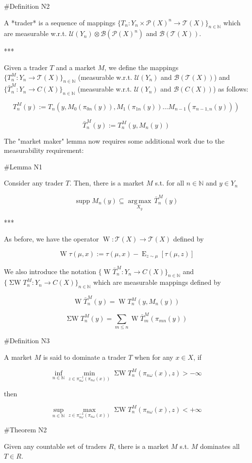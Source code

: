 \documentclass[a4paper]{article}
\DeclareMathOperator{\Supp}{supp}
\DeclareMathOperator{\E}{E}
\newcommand{\Argmax}[1]{\underset{#1}{\operatorname{arg\,max}}\,}
\newcommand{\Nats}{\mathbb{N}}
\newcommand{\Prob}{\mathcal{P}}
\newcommand{\T}{\mathcal{T}}
\newcommand{\B}{\mathcal{B}}
\newcommand{\UM}{\mathcal{U}}
\newcommand{\W}{\operatorname{W}}
\newcommand{\SW}{\operatorname{\Sigma W}}
\begin{document}
\#Definition N2

A *trader* is a sequence of mappings ${\{T_n: Y_n \times \Prob(X)^n \rightarrow \T(X)\}}_{n \in \Nats}$ which are measurable w.r.t. ${\UM(Y_n) \otimes \B(\Prob(X)^n)}$ and ${\B(\T(X))}$.

***

Given a trader ${T}$ and a market ${M}$, we define the mappings ${\{T^M_n: Y_n \rightarrow \T(X)\}_{n \in \Nats}}$ (measurable w.r.t. ${\UM(Y_n)}$ and ${\B(\T(X))}$) and ${\{\bar{T}^M_n: Y_n \rightarrow C(X)\}_{n \in \Nats}}$ (measurable w.r.t. ${\UM(Y_n)}$ and ${\B(C(X))}$) as follows:

$$T^M_n(y):= T_n(y, M_0(\pi_{0n}(y)),M_1(\pi_{1n}(y)) \ldots M_{n-1}(\pi_{n-1,n}(y)))$$

$$\bar{T}^M_n(y):= T^M_n(y,M_n(y))$$

The "market maker" lemma now requires some additional work due to the measurability requirement:

\#Lemma N1

Consider any trader ${T}$. Then, there is a market ${M}$ s.t. for all ${n \in \Nats}$ and ${y \in Y_n}$

$$\Supp M_n(y) \subseteq \Argmax{X_y} \bar{T}^M_n(y)$$

***

As before, we have the operator ${\W: \T(X) \rightarrow \T(X)}$ defined by 

$$\W \tau(\mu,x):= \tau(\mu,x) - \E_{z \sim \mu}[\tau(\mu,z)]$$

We also introduce the notation ${\{\W \bar{T}^M_n: Y_n \rightarrow C(X)\}_{n \in \Nats}}$ and ${\{\SW T^M_n: Y_n \rightarrow C(X)\}_{n \in \Nats}}$ which are measurable mappings defined by

$$\W \bar{T}^M_n(y) = \W T^M_n(y, M_n(y))$$

$$\SW T^M_n(y) = \sum_{m \leq n} \W \bar{T}^M_m(\pi_{mn}(y))$$

\#Definition N3

A market ${M}$ is said to dominate a trader ${T}$ when for any ${x \in X}$, if

$$\inf_{n \in \Nats} \min_{z \in \pi_{n\omega}^{-1}(\pi_{n\omega}(x))} \SW T^M_n(\pi_{n\omega}(x),z) > -\infty$$

then

$$\sup_{n \in \Nats} \max_{z \in \pi_{n\omega}^{-1}(\pi_{n\omega}(x))} \SW T^M_n(\pi_{n\omega}(x),z) < +\infty$$

\#Theorem N2

Given any countable set of traders $R$, there is a market ${M}$ s.t. ${M}$ dominates all ${T \in R}$.
\end{document}
